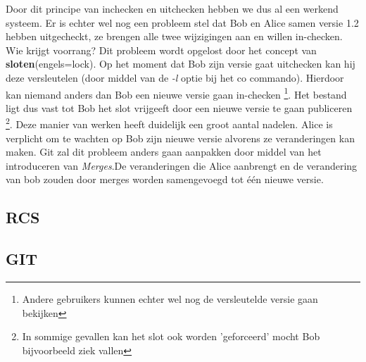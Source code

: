 Door dit principe van inchecken en uitchecken hebben we dus al een werkend systeem. Er is echter wel nog een probleem stel dat Bob en Alice samen versie 1.2 hebben uitgecheckt, ze brengen alle twee wijzigingen aan en willen in-checken. Wie krijgt voorrang? Dit probleem wordt opgelost door het concept van \textbf{sloten}(engels=lock). Op het moment dat  Bob zijn versie gaat uitchecken kan hij deze versleutelen (door middel van de \textit{-l} optie bij het co commando). Hierdoor kan niemand anders dan Bob een nieuwe versie gaan in-checken \footnote{Andere gebruikers kunnen echter wel nog de versleutelde versie gaan bekijken}. Het bestand ligt dus vast tot Bob het slot vrijgeeft door een nieuwe versie te gaan publiceren \footnote{In sommige gevallen kan het slot ook worden 'geforceerd' mocht Bob bijvoorbeeld ziek vallen}. Deze manier van werken heeft duidelijk een groot aantal nadelen. Alice is verplicht om te wachten op Bob zijn nieuwe versie alvorens ze veranderingen kan maken. Git zal dit probleem anders gaan aanpakken door middel van het introduceren van \textit{Merges}.De veranderingen die Alice aanbrengt en de verandering van bob zouden door merges worden samengevoegd tot één nieuwe versie.\\

\label{par:branches}

\subsection{RCS}
\subsection{GIT}
\label{sec:GIT}
